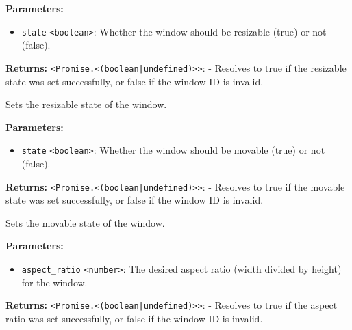 \documentclass[12pt,a4paper]{article}
\begin{document}
\noindent \textbf{Parameters:}
\begin{itemize}
  \item \texttt{state} \texttt{<boolean>}: Whether the window should be resizable (\textasciigrave{}true\textasciigrave{}) or not (\textasciigrave{}false\textasciigrave{}).
\end{itemize}

\noindent \textbf{Returns:} \texttt{<Promise.<(boolean|undefined)>>}: - Resolves to \textasciigrave{}true\textasciigrave{} if the resizable state was set successfully, or \textasciigrave{}false\textasciigrave{} if the window ID is invalid.

\noindent Sets the resizable state of the window.

\vspace{5mm}
\noindent {}


\noindent \textbf{Parameters:}
\begin{itemize}
  \item \texttt{state} \texttt{<boolean>}: Whether the window should be movable (\textasciigrave{}true\textasciigrave{}) or not (\textasciigrave{}false\textasciigrave{}).
\end{itemize}

\noindent \textbf{Returns:} \texttt{<Promise.<(boolean|undefined)>>}: - Resolves to \textasciigrave{}true\textasciigrave{} if the movable state was set successfully, or \textasciigrave{}false\textasciigrave{} if the window ID is invalid.

\noindent Sets the movable state of the window.

\vspace{5mm}
\noindent {}


\noindent \textbf{Parameters:}
\begin{itemize}
  \item \texttt{aspect\_ratio} \texttt{<number>}: The desired aspect ratio (width divided by height) for the window.
\end{itemize}

\noindent \textbf{Returns:} \texttt{<Promise.<(boolean|undefined)>>}: - Resolves to \textasciigrave{}true\textasciigrave{} if the aspect ratio was set successfully, or \textasciigrave{}false\textasciigrave{} if the window ID is invalid.
\end{document}
